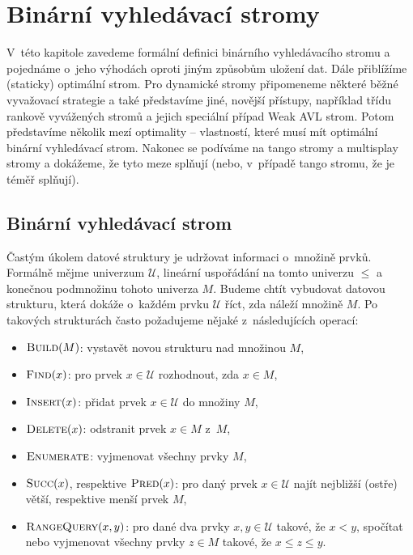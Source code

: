\chapter{Binární vyhledávací stromy}

V~této kapitole zavedeme formální definici binárního vyhledávacího stromu a
pojednáme o~jeho výhodách oproti jiným způsobům uložení dat. Dále přiblížíme
(staticky) optimální strom. Pro dynamické stromy připomeneme některé běžné
vyvažovací strategie a také představíme jiné, novější přístupy, například třídu
rankově vyvážených stromů a jejich speciální případ Weak AVL strom. Potom
představíme několik mezí optimality -- vlastností, které musí mít optimální
binární vyhledávací strom. Nakonec se podíváme na tango stromy a multisplay
stromy a dokážeme, že tyto meze splňují (nebo, v~případě tango stromu, že je
téměř splňují).

\section{Binární vyhledávací strom}
\def\U{\mathcal U}
\def\o{\mathcal O}
\let\op\operatorname

Častým úkolem datové struktury je udržovat informaci o~množině prvků. Formálně
mějme univerzum $\mathcal U$, lineární uspořádání na tomto univerzu $\leq$ a
konečnou podmnožinu tohoto univerza $M$. Budeme chtít vybudovat datovou strukturu, která dokáže
o~každém prvku $\mathcal U$ říct, zda náleží množině $M$. Po takových
strukturách často požadujeme nějaké z~následujících operací:

\begin{itemize}
\item $\ope{Build}(M)$: vystavět novou strukturu nad množinou $M$,
\item $\ope{Find}(x)$: pro prvek $x \in \U$ rozhodnout, zda $x\in M$,
\item $\ope{Insert}(x)$: přidat prvek $x \in \U$ do množiny $M$,
\item $\ope{Delete}(x)$: odstranit prvek $x\in M$ z~$M$,
\item $\ope{Enumerate}$: vyjmenovat všechny prvky $M$,
\item $\ope{Succ}(x)$, respektive $\ope{Pred}(x)$: pro daný prvek $x\in \U $ najít nejbližší (ostře) větší, respektive menší prvek $M$,
\item $\ope{RangeQuery}(x,y)$: pro dané dva prvky $x,y\in\U$ takové, že $x<y$, spočítat nebo vyjmenovat všechny prvky $z\in M$ takové, že $x \leq z \leq y$.
\end{itemize}

